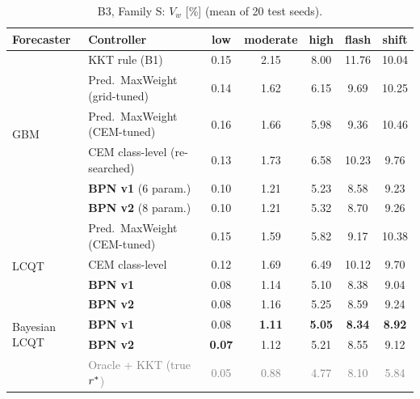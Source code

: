 \begin{table}[H]
\caption{B3, Family S: $V_w$ [\%] (mean of 20 test seeds).}
\label{tab:b3-s}
\centering\small
\setlength{\tabcolsep}{4pt}
\begin{tabular}{llccccc}
\toprule
Forecaster & Controller & low & moderate & high & flash & shift \\
\midrule
\multirow{6}{*}{GBM} & KKT rule (B1) & 0.15 & 2.15 & 8.00 & 11.76 & 10.04 \\
& Pred.\ MaxWeight (grid-tuned) & 0.14 & 1.62 & 6.15 & 9.69 & 10.25 \\
& Pred.\ MaxWeight (CEM-tuned) & 0.16 & 1.66 & 5.98 & 9.36 & 10.46 \\
& CEM class-level (re-searched) & 0.13 & 1.73 & 6.58 & 10.23 & 9.76 \\
& \cellcolor{good!12}\textbf{BPN v1} (6 param.) & \cellcolor{good!12}0.10 & \cellcolor{good!12}1.21 & \cellcolor{good!12}5.23 & \cellcolor{good!12}8.58 & \cellcolor{good!12}9.23 \\
& \cellcolor{good!12}\textbf{BPN v2} (8 param.) & \cellcolor{good!12}0.10 & \cellcolor{good!12}1.21 & \cellcolor{good!12}5.32 & \cellcolor{good!12}8.70 & \cellcolor{good!12}9.26 \\
\midrule
\multirow{4}{*}{LCQT} & Pred.\ MaxWeight (CEM-tuned) & 0.15 & 1.59 & 5.82 & 9.17 & 10.38 \\
& CEM class-level & 0.12 & 1.69 & 6.49 & 10.12 & 9.70 \\
& \cellcolor{good!12}\textbf{BPN v1} & \cellcolor{good!12}0.08 & \cellcolor{good!12}1.14 & \cellcolor{good!12}5.10 & \cellcolor{good!12}8.38 & \cellcolor{good!12}9.04 \\
& \cellcolor{good!12}\textbf{BPN v2} & \cellcolor{good!12}0.08 & \cellcolor{good!12}1.16 & \cellcolor{good!12}5.25 & \cellcolor{good!12}8.59 & \cellcolor{good!12}9.24 \\
\midrule
\multirow{2}{*}{Bayesian LCQT} & \cellcolor{good!12}\textbf{BPN v1} & \cellcolor{good!12}0.08 & \cellcolor{good!12}\textbf{1.11} & \cellcolor{good!12}\textbf{5.05} & \cellcolor{good!12}\textbf{8.34} & \cellcolor{good!12}\textbf{8.92} \\
& \cellcolor{good!12}\textbf{BPN v2} & \cellcolor{good!12}\textbf{0.07} & \cellcolor{good!12}1.12 & \cellcolor{good!12}5.21 & \cellcolor{good!12}8.55 & \cellcolor{good!12}9.12 \\
\midrule
 & \textcolor{gray}{Oracle + KKT (true $r^{\ast}$)} & \textcolor{gray}{0.05} & \textcolor{gray}{0.88} & \textcolor{gray}{4.77} & \textcolor{gray}{8.10} & \textcolor{gray}{5.84} \\
\bottomrule
\end{tabular}
\end{table}

